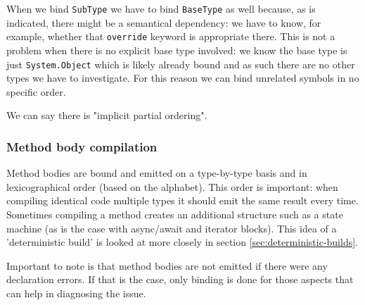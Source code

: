 When we bind \verb|SubType| we have to bind \verb|BaseType| as well because, as is indicated, there might be a semantical dependency: we have to know, for example, whether that \verb|override| keyword is appropriate there. This is not a problem when there is no explicit base type involved: we know the base type is just \verb|System.Object| which is likely already bound and as such there are no other types we have to investigate. For this reason we can bind unrelated symbols in no specific order.

\noindent We can say there is "implicit partial ordering".\parencite{Sadov2014}

\subsubsection{Method body compilation }
\label{sec:concur-symbol-binding}

Method bodies are bound and emitted on a type-by-type basis and in lexicographical order (based on the alphabet). This order is important: when compiling identical code multiple types it should emit the same result every time. Sometimes compiling a method creates an additional structure such as a state machine (as is the case with async/await and iterator blocks). This idea of a 'deterministic build' is looked at more closely in section \ref{sec:deterministic-builds}. 

Important to note is that method bodies are not emitted if there were any declaration errors. If that is the case, only binding is done for those aspects that can help in diagnosing the issue.\parencite{Sadov2014}

